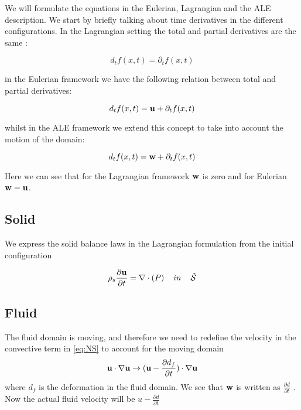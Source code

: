 We will formulate the equations in the Eulerian, Lagrangian and the ALE description. We start by briefly talking about time derivatives in the different configurations. In the Lagrangian setting the total and partial derivatives are the same \cite{Wick2011}:

\begin{equation}
d_t f(x,t) = \partial_t f(x,t)
\end{equation}

in the Eulerian framework we have the following relation between total and partial derivatives:

\begin{equation}
d_t f(x,t) = \bold{u} + \partial_t f(x,t)
\end{equation}

whilst in the ALE framework we extend this concept to take into account the motion of the domain:

\begin{equation}
d_t f(x,t) = \bold{w} + \partial_t f(x,t)
\end{equation}

Here we can see that for the Lagrangian framework $ \bold{w}$ is zero and for Eulerian $\bold{w} = \bold{u}$.

\subsection{Solid}
We express the solid balance laws in the Lagrangian formulation from the initial configuration

\begin{equation}
\rho_s \frac{\partial \bold{u}}{\partial t} = \nabla \cdot (P) \hspace{4mm}in\hspace{4mm} \hat{\mathcal{S}} 
\end{equation}

\subsection{Fluid}

The fluid domain is moving, and therefore we need to redefine the velocity in the convective term in \eqref{eq:NS} to account for the moving domain 
\begin{equation}
\bold{u} \cdot \nabla \bold{u} \rightarrow (\bold{u}-\frac{\partial d_f}{\partial t}) \cdot \nabla \bold{u}  
\end{equation}
where $d_f$ is the deformation in the fluid domain. We see that $\bold{w}$ is written as $\frac{\partial d}{\partial t}$ . Now the actual fluid velocity will be $u-\frac{\partial d}{\partial t}$ 

